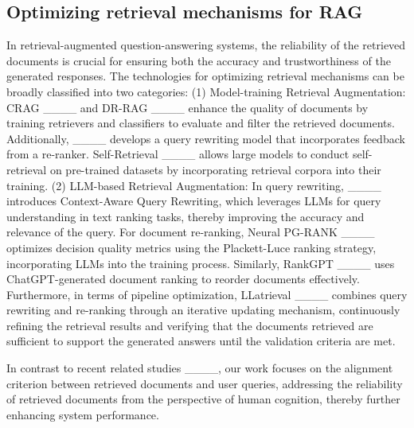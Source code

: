 \subsection{Optimizing retrieval mechanisms for RAG}
In retrieval-augmented question-answering systems, the reliability of the retrieved documents is crucial for ensuring both the accuracy and trustworthiness of the generated responses. The technologies for optimizing retrieval mechanisms can be broadly classified into two categories: (1) Model-training Retrieval Augmentation: CRAG ____ and DR-RAG ____ enhance the quality of documents by training retrievers and classifiers to evaluate and filter the retrieved documents. Additionally, ____ develops a query rewriting model that incorporates feedback from a re-ranker. Self-Retrieval ____ allows large models to conduct self-retrieval on pre-trained datasets by incorporating retrieval corpora into their training. (2) LLM-based Retrieval Augmentation: In query rewriting, ____ introduces Context-Aware Query Rewriting, which leverages LLMs for query understanding in text ranking tasks, thereby improving the accuracy and relevance of the query. For document re-ranking, Neural PG-RANK ____ optimizes decision quality metrics using the Plackett-Luce ranking strategy, incorporating LLMs into the training process. Similarly, RankGPT ____ uses ChatGPT-generated document ranking to reorder documents effectively. Furthermore, in terms of pipeline optimization, LLatrieval ____ combines query rewriting and re-ranking through an iterative updating mechanism, continuously refining the retrieval results and verifying that the documents retrieved are sufficient to support the generated answers until the validation criteria are met.

In contrast to recent related studies ____, our work focuses on the alignment criterion between retrieved documents and user queries, addressing the reliability of retrieved documents from the perspective of human cognition, thereby further enhancing system performance.